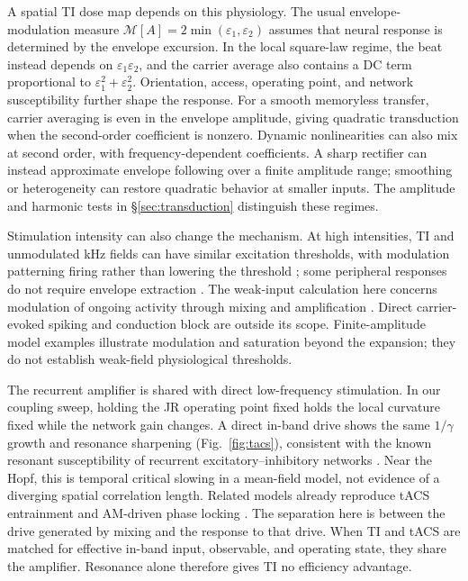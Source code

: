 \documentclass[11pt,a4paper]{article}
\begin{document}
A spatial TI dose map depends on this physiology. The usual envelope-modulation
measure $\mathcal M[A]=2\min(\varepsilon_1,\varepsilon_2)$ assumes that neural
response is determined by the envelope excursion. In the local square-law regime,
the beat instead depends on $\varepsilon_1\varepsilon_2$, and the carrier average
also contains a DC term proportional to $\varepsilon_1^2+\varepsilon_2^2$.
Orientation, access, operating point, and network susceptibility further shape
the response. For a smooth memoryless transfer, carrier averaging is even in the
envelope amplitude, giving quadratic transduction when the second-order coefficient
is nonzero. Dynamic nonlinearities can also mix at second order, with
frequency-dependent coefficients. A sharp rectifier can instead approximate
envelope following over a finite amplitude range; smoothing or heterogeneity
can restore quadratic behavior at smaller inputs. The amplitude and harmonic
tests in \S\ref{sec:transduction} distinguish these regimes.

Stimulation intensity can also change the mechanism. At high intensities, TI and
unmodulated kHz fields can have similar excitation thresholds, with modulation
patterning firing rather than lowering the threshold
\cite{opancar2025,semenov2025}; some peripheral responses do not require envelope
extraction \cite{peripheral2023}. The weak-input calculation here concerns
modulation of ongoing activity through mixing and amplification
\cite{vieira2024,missey2026}. Direct carrier-evoked spiking and conduction block
are outside its scope. Finite-amplitude model examples illustrate modulation and
saturation beyond the expansion; they do not establish weak-field physiological
thresholds.

The recurrent amplifier is shared with direct low-frequency stimulation. In our
coupling sweep, holding the JR operating point fixed holds the local curvature
fixed while the network gain changes. A direct in-band drive shows the same
$1/\gamma$ growth and resonance sharpening (Fig.~\ref{fig:tacs}), consistent with
the known resonant susceptibility of recurrent excitatory--inhibitory networks
\cite{ledoux2011,clusella2023}. Near the Hopf, this is temporal critical slowing
in a mean-field model, not evidence of a diverging spatial correlation length.
Related models already reproduce tACS entrainment and AM-driven phase locking
\cite{ali2013,negahbani2018,krause2023}. The separation here is between the drive
generated by mixing and the response to that drive. When TI and tACS are matched
for effective in-band input, observable, and operating state, they share the
amplifier. Resonance alone therefore gives TI no efficiency advantage.
\end{document}
